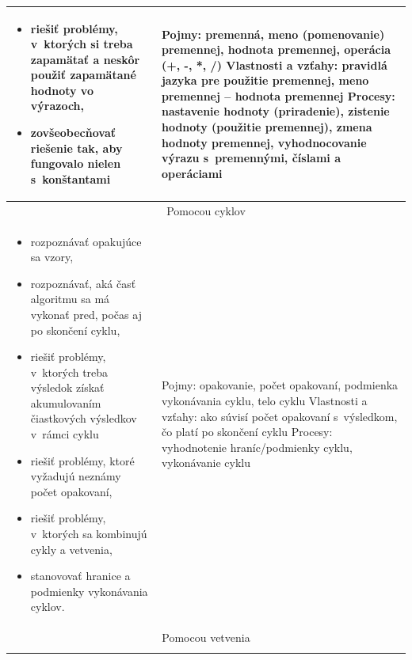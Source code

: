 \documentclass[FP,DP]{tulthesis}
\begin{document}
{{{{{{\begin{table}[t]
\begin{tabular}{|l|l|}
\begin{minipage}[t]{0.45\textwidth}
\begin{itemize}[leftmargin=*,nosep]
	\item riešiť problémy, v~ktorých si treba zapamätať a neskôr použiť
zapamätané hodnoty vo výrazoch,
\item zovšeobecňovať riešenie tak, aby fungovalo nielen s~konštantami
\end{itemize}
  \end{minipage} &
  \begin{minipage}[t]{0.45\textwidth}
Pojmy: premenná, meno (pomenovanie) premennej, hodnota premennej,
operácia (+, -, *, /)
Vlastnosti a vzťahy: pravidlá jazyka pre použitie premennej, meno premennej
– hodnota premennej
Procesy: nastavenie hodnoty (priradenie), zistenie hodnoty (použitie
premennej), zmena hodnoty premennej, vyhodnocovanie výrazu
s~premennými, číslami a operáciami
  \end{minipage}\\\hline
\multicolumn{2}{|c|}{Pomocou cyklov}\\\hline
\begin{minipage}[t]{0.45\textwidth}
\begin{itemize}[leftmargin=*,nosep]
  	\item rozpoznávať opakujúce sa vzory,
	\item rozpoznávať, aká časť algoritmu sa má vykonať pred, počas aj po
skončení cyklu,
\item riešiť problémy, v~ktorých treba výsledok získať akumulovaním
čiastkových výsledkov v~rámci cyklu
\item riešiť problémy, ktoré vyžadujú neznámy počet opakovaní,
\item riešiť problémy, v~ktorých sa kombinujú cykly a vetvenia,
\item stanovovať hranice a podmienky vykonávania cyklov.
\end{itemize}
  \end{minipage} &
  \begin{minipage}[t]{0.45\textwidth}
Pojmy: opakovanie, počet opakovaní, podmienka vykonávania cyklu,
telo cyklu
Vlastnosti a vzťahy: ako súvisí počet opakovaní s~výsledkom, čo platí
po skončení cyklu
Procesy: vyhodnotenie hraníc/podmienky cyklu, vykonávanie cyklu
  \end{minipage}\\\hline
\multicolumn{2}{|c|}{Pomocou vetvenia}\\\hline
\begin{minipage}[t]{0.45\textwidth}
\begin{itemize}[leftmargin=*,nosep]

\end{itemize}
\end{minipage}
\end{tabular}
\end{table}}}}}}}
\end{document}
